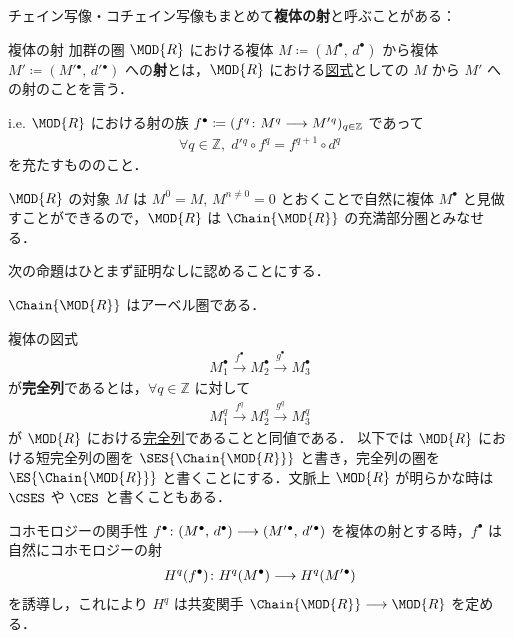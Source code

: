 \documentclass[algtopo_main]{subfiles}
\begin{document}
チェイン写像・コチェイン写像もまとめて\textbf{複体の射}と呼ぶことがある：

\begin{mydef}[label=def:chain-morphism]{複体の射}
    加群の圏 $\MOD{R}$ における複体 $M \coloneqq (M^\bullet,\, d^\bullet)$ から複体 $M' \coloneqq (M'{}^\bullet,\, d'{}^\bullet)$ への\textbf{射}とは，$\MOD{R}$ における\hyperref[def:diagram]{図式}としての $M$ から $M'$ への射のことを言う．

    i.e. $\MOD{R}$ における射の族 $f^\bullet \coloneqq (f^q \colon M^q \longrightarrow M'{}^q)_{q \in \mathbb{Z}}$ であって
    \begin{align}
        \forall q \in \mathbb{Z},\; d'{}^q \circ f^q = f^{q+1} \circ d^q
    \end{align}
    を充たすもののこと．
\end{mydef}

$\MOD{R}$ の対象 $M$ は $M^0 = M,\, M^{n \neq 0} = 0$ とおくことで自然に複体 $M^\bullet$ と見做すことができるので，$\MOD{R}$ は $\Chain{\MOD{R}}$ の充満部分圏とみなせる．

次の命題はひとまず証明なしに認めることにする．

\begin{myprop}[label=prop:CHAIN-Abelian]{}
    $\Chain{\MOD{R}}$ はアーベル圏である．
\end{myprop}

複体の図式
\begin{align}
    M_1^\bullet \xrightarrow{f^\bullet} M_2^\bullet \xrightarrow{g^\bullet} M_3^\bullet
\end{align}
が\textbf{完全列}であるとは，$\forall q \in \mathbb{Z}$ に対して
\begin{align}
    M_1^q \xrightarrow{f^q} M_2^q \xrightarrow{g^q} M_3^q
\end{align}
が $\MOD{R}$ における\hyperref[def:ES]{完全列}であることと同値である．
以下では $\MOD{R}$ における短完全列の圏を $\SES{\Chain{\MOD{R}}}$ と書き，完全列の圏を $\ES{\Chain{\MOD{R}}}$ と書くことにする．文脈上 $\MOD{R}$ が明らかな時は $\CSES$ や $\CES$ と書くこともある．

\begin{myprop}[label=prop:cohomology-morphism]{コホモロジーの関手性}
    $f^\bullet \colon (M^\bullet,\, d^\bullet) \longrightarrow (M'{}^\bullet,\, d'{}^\bullet)$ を複体の射とする時，$f^\bullet$ は自然にコホモロジーの射
    \begin{align}
        H^q(f^\bullet) \colon H^q (M^\bullet) \longrightarrow H^q (M'{}^\bullet)
    \end{align}
    を誘導し，これにより $H^q$ は共変関手 $\Chain{\MOD{R}} \lto \MOD{R}$ を定める．
\end{myprop}
\end{document}
